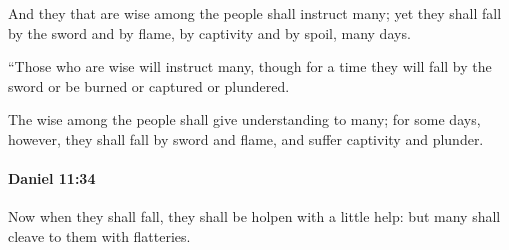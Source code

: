 			\begin{versebox}
					\item[BHS] 
					\item[LXX] 
					\item[ASV] And they that are wise among the people shall instruct many; yet they shall fall by the sword and by flame, by captivity and by spoil, many days.
					\item[NIV] “Those who are wise will instruct many, though for a time they will fall by the sword or be burned or captured or plundered.
					\item[NRSV] The wise among the people shall give understanding to many; for some days, however, they shall fall by sword and flame, and suffer captivity and plunder.
			\end{versebox}

		\paragraph{Daniel 11:34} %
			\label{DANIEL-11-34}

			Now when they shall fall, they shall be holpen with a little help: but many shall cleave to them with flatteries.

